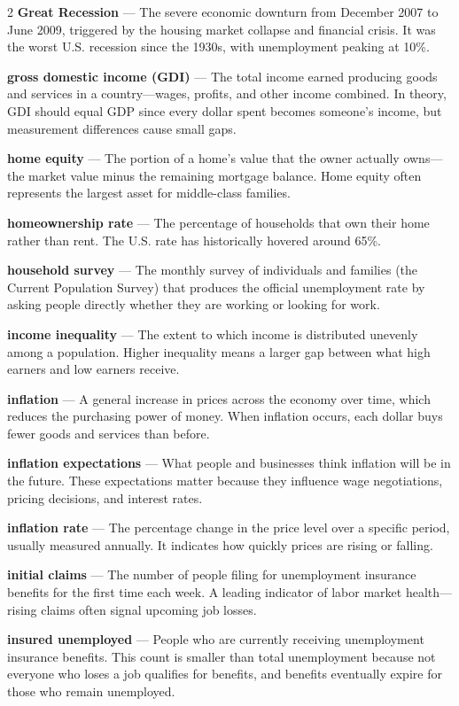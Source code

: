 \begin{multicols}{2}
\textbf{Great Recession} --- The severe economic downturn from December 2007 to June 2009, triggered by the housing market collapse and financial crisis. It was the worst U.S. recession since the 1930s, with unemployment peaking at 10\%.

\textbf{gross domestic income (GDI)} --- The total income earned producing goods and services in a country---wages, profits, and other income combined. In theory, GDI should equal GDP since every dollar spent becomes someone's income, but measurement differences cause small gaps.

\textbf{home equity} --- The portion of a home's value that the owner actually owns---the market value minus the remaining mortgage balance. Home equity often represents the largest asset for middle-class families.

\textbf{homeownership rate} --- The percentage of households that own their home rather than rent. The U.S. rate has historically hovered around 65\%.

\textbf{household survey} --- The monthly survey of individuals and families (the Current Population Survey) that produces the official unemployment rate by asking people directly whether they are working or looking for work.

\textbf{income inequality} --- The extent to which income is distributed unevenly among a population. Higher inequality means a larger gap between what high earners and low earners receive.

\textbf{inflation} --- A general increase in prices across the economy over time, which reduces the purchasing power of money. When inflation occurs, each dollar buys fewer goods and services than before.

\textbf{inflation expectations} --- What people and businesses think inflation will be in the future. These expectations matter because they influence wage negotiations, pricing decisions, and interest rates.

\textbf{inflation rate} --- The percentage change in the price level over a specific period, usually measured annually. It indicates how quickly prices are rising or falling.

\textbf{initial claims} --- The number of people filing for unemployment insurance benefits for the first time each week. A leading indicator of labor market health---rising claims often signal upcoming job losses.

\textbf{insured unemployed} --- People who are currently receiving unemployment insurance benefits. This count is smaller than total unemployment because not everyone who loses a job qualifies for benefits, and benefits eventually expire for those who remain unemployed.


\end{multicols}
